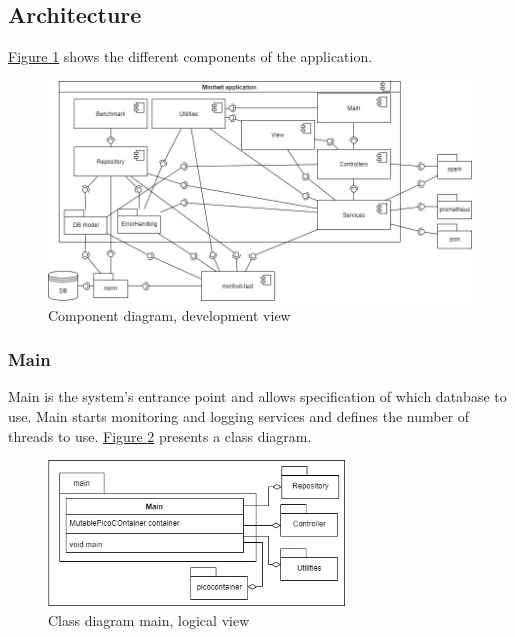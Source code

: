 \subsection{Architecture}

\hyperref[fig:componentDiagram]{Figure \ref{fig:componentDiagram}} shows the different components of the application.

\begin{figure}[H]
    \centering
    \hspace*{-0.5in}
    \includegraphics[width=1.2\textwidth]{images/Diagrams-Development_view_component_diagram.jpg}
    \caption{Component diagram, development view}
    \label{fig:componentDiagram}
\end{figure}

\subsubsection{Main}
Main is the system's entrance point and allows specification of which database to use. Main starts monitoring and logging services and defines the number of threads to use. \hyperref[fig:classDiagramMain]{Figure \ref{fig:classDiagramMain}} presents a class diagram. 
\begin{figure}[H]
    \centering
    \includegraphics[width=0.7\textwidth]{images/class_diagram_main.jpg}
    \caption{Class diagram main, logical view}
    \label{fig:classDiagramMain}
\end{figure}

